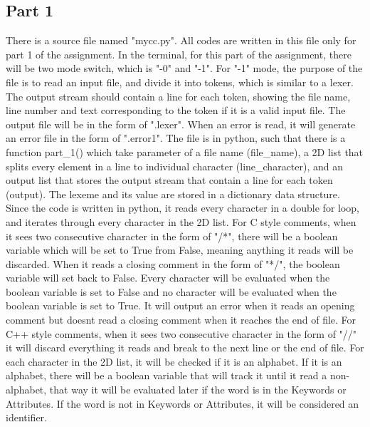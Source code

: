 \documentclass[11pt]{article}
\begin{document}
\subsection{Part 1}
There is a source file named "mycc.py". All codes are written in this file only for part 1 of the assignment. In the terminal, for this part of the assignment, there will be two mode switch, which is "-0" and "-1". For "-1" mode, the purpose of the file is to read an input file, and divide it into tokens, which is similar to a lexer. The output stream should contain a line for each token, showing the file name, line number and text corresponding to the token if it is a valid input file. The output file will be  in the form of ".lexer". When an error is read, it will generate an error file in the form of ".error1". The file is in python, such that there is a function part\_1() which take parameter of a file name (file\_name), a 2D list that splits every element in a line to individual character (line\_character), and an output list that stores the output stream that contain a line for each token (output). The lexeme and its value are stored in a dictionary data structure.\newline
\newline
Since the code is written in python, it reads every character in a double for loop, and iterates through every character in the 2D list. For C style comments, when it sees two consecutive character in the form of "/*", there will be a boolean variable which will be set to True from False, meaning anything it reads will be discarded. When it reads a closing comment in the form of "*/", the boolean variable will set back to False. Every character will be evaluated when the boolean variable is set to False and no character will be evaluated when the boolean variable is set to True. It will output an error when it reads an opening comment but doesnt read a closing comment when it reaches the end of file. For C++ style comments, when it sees two consecutive character in the form of "//" it will discard everything it reads and break to the next line or the end of file.\newline
\newline
For each character in the 2D list, it will be checked if it is an alphabet. If it is an alphabet, there will be a boolean variable that will track it until it read a non-alphabet, that way it will be evaluated later if the word is in the Keywords or Attributes. If the word is not in Keywords or Attributes, it will be considered an identifier.\newline
\end{document}
